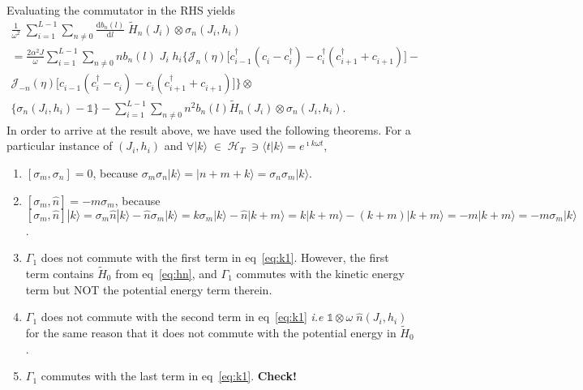 \documentclass[a4paper,10pt]{article}
\begin{document}
Evaluating the commutator in the RHS yields
\begin{multline}
\label{eq:firstiter}
\frac{1}{\omega^2}\;\sum_{i=1}^{L-1} \sum_{n\neq 0} \frac{\mathrm{d}b_n(l)}{\mathrm{d}l}\;\tilde{H}_n(J_i)  \otimes \sigma_n(J_i,h_i) \\
= \frac{2\alpha^2 J}{\omega}\sum_{i=1}^{L-1}\sum_{n\neq0} n b_n(l)\;J_i\; h_i \bigg\{
\mathcal{J}_n(\eta)\bigg[c^\dagger_{i-1}\left(c^{\;}_i - c^\dagger_i\right) - c^\dagger_i\left( c^\dagger_{i+1}+c^{\;}_{i+1} \right) 
\bigg]-\\
\mathcal{J}_{-n}(\eta)\bigg[c^{\;}_{i-1} \left(c^\dagger_i -c^{\;}_i\right)-c^{\;}_i \left(c^\dagger_{i+1}+c^{\;}_{i+1}\right) 
\bigg]   \bigg\}\otimes\\ \bigg\{\sigma_n(J_i,h_i)-\mathds{1}\bigg\}- \sum_{i=1}^{L-1}\sum_{n\neq0} n^2 b_n(l) \tilde{H}_n (J_i)\otimes  \sigma_n(J_i,h_i).
\end{multline}
In order to arrive at the result above, we have used the following theorems. For a particular instance of $(J_i,h_i)$ and $\forall |k\rangle\;\in\;\mathcal{H}_T\; \ni \langle t |k\rangle = e^{\imath k \omega t}$,
\begin{enumerate}
 \item
 $\left[\sigma_m,\sigma_n\right] = 0$, because  
 $\sigma_m\sigma_n|k\rangle=|n+m+k\rangle=\sigma_n\sigma_m|k\rangle$.
\item
$[\sigma_m,\hat{n}] = -m\sigma_m$, because $[\sigma_m,\hat{n}]|k\rangle = \sigma_m\hat{n}|k\rangle- \hat{n}\sigma_m|k\rangle = k\sigma_m|k\rangle-\hat{n}|k+m\rangle = k|k+m\rangle-(k+m)|k+m\rangle = -m|k+m\rangle=-m\sigma_m|k\rangle$.
 \item
 $\Gamma_1$ does not commute with the first term in  eq~\ref{eq:k1}. However, the first term contains $\tilde{H}_0$ from eq~\ref{eq:hn}, and $\Gamma_1$ commutes with the kinetic energy term but NOT the potential energy term therein.
 \item
 $\Gamma_1$ does not commute with the second term in eq~\ref{eq:k1} \textit{i.e} $\mathds{1}\otimes \omega \; \hat{n}(J_i,h_i) $ for the same reason that it does not commute with the potential energy in $\tilde{H}_0$.
\item 
 $\Gamma_1$ commutes with the  last term in eq~\ref{eq:k1}. \textbf{Check!}
\end{enumerate}
\end{document}
